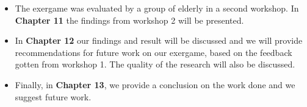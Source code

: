 \begin{itemize}
\item The exergame was evaluated by a group of elderly in a second workshop. In \textbf{Chapter 11} the findings from workshop 2 will be presented.
\item In \textbf{Chapter 12} our findings and result will be discussed and we will provide recommendations for future work on our exergame, based on the feedback gotten from workshop 1. The quality of the research will also be discussed.
\item Finally, in \textbf{Chapter 13}, we provide a conclusion on the work done and we suggest future work.

\end{itemize}
